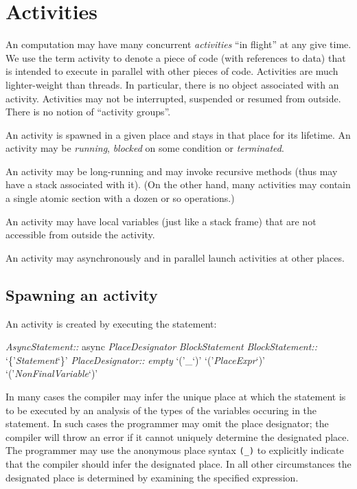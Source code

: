 \chapter{Activities}\label{XtenActivities}

An \Xten{} computation may have many concurrent {\em activities} ``in
flight'' at any give time. We use the term activity to denote a piece
of code (with references to data) that is intended to execute in
parallel with other pieces of code. Activities are much lighter-weight
than threads. In particular, there is no object associated with an
activity. Activities may not be interrupted, suspended or resumed from
outside. There is no notion of ``activity groups''. 

An activity is spawned in a given place and stays in that place for
its lifetime.  An activity may be {\em running}, {\em blocked} on some
condition or {\em terminated}.

An activity may be long-running and may invoke recursive methods (thus
may have a stack associated with it). (On the other hand, many
activities may contain a single atomic section with a dozen or so
operations.)

An activity may have local variables (just like a stack frame) that
are not accessible from outside the activity.

An activity may asynchronously and in parallel launch activities at
other places.

\section{Spawning an activity}\label{AsynchronousActivity}\label{AsyncActivity}
An activity is created by executing the statement:
\begin{x10}
{\cf\em{}AsyncStatement::}
   async {\cf\em{}PlaceDesignator} {\cf\em{}BlockStatement}
{\cf\em{}BlockStatement::}
  `\{'{\cf\em{}Statement}`\}' 
{\cf\em{}PlaceDesignator::}
    {\cf\em{}empty}
    `('\_`)'
    `('{\cf\em{}PlaceExpr}`)'
    `('{\cf\em{}NonFinalVariable}`)'
\end{x10} 

In many cases the compiler may infer the unique place at which the
statement is to be executed by an analysis of the types of the
variables occuring in the statement. In such cases the programmer may
omit the place designator; the compiler will throw an error if it
cannot uniquely determine the designated place. The programmer may use
the anonymous place syntax {\tt (\_)} to explicitly indicate that the
compiler should infer the designated place. In all other circumstances
the designated place is determined by examining the specified
expression.

